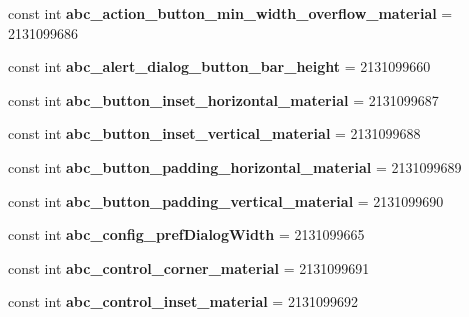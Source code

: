 \begin{DoxyCompactItemize}
const int {\bfseries abc\+\_\+action\+\_\+button\+\_\+min\+\_\+width\+\_\+overflow\+\_\+material} = 2131099686
\item 
\mbox{\label{classXaria_1_1Resource_1_1Dimension_a664c35cef7f345724371f308d2eff018}} 
const int {\bfseries abc\+\_\+alert\+\_\+dialog\+\_\+button\+\_\+bar\+\_\+height} = 2131099660
\item 
\mbox{\label{classXaria_1_1Resource_1_1Dimension_a2368b02c2bd6f322ac9a4c2187ea9846}} 
const int {\bfseries abc\+\_\+button\+\_\+inset\+\_\+horizontal\+\_\+material} = 2131099687
\item 
\mbox{\label{classXaria_1_1Resource_1_1Dimension_a1a6eefb01eb4f61d93b0d4a05e4269e3}} 
const int {\bfseries abc\+\_\+button\+\_\+inset\+\_\+vertical\+\_\+material} = 2131099688
\item 
\mbox{\label{classXaria_1_1Resource_1_1Dimension_a255e270df1e8fcaf77a4a60d386802fe}} 
const int {\bfseries abc\+\_\+button\+\_\+padding\+\_\+horizontal\+\_\+material} = 2131099689
\item 
\mbox{\label{classXaria_1_1Resource_1_1Dimension_afe5da03dcfd73a8e881bcd8be643ead4}} 
const int {\bfseries abc\+\_\+button\+\_\+padding\+\_\+vertical\+\_\+material} = 2131099690
\item 
\mbox{\label{classXaria_1_1Resource_1_1Dimension_ad1eabbc683c3d80fa9370606516b7a1c}} 
const int {\bfseries abc\+\_\+config\+\_\+pref\+Dialog\+Width} = 2131099665
\item 
\mbox{\label{classXaria_1_1Resource_1_1Dimension_a4c115f5595c2f85b912aa87b25f14b75}} 
const int {\bfseries abc\+\_\+control\+\_\+corner\+\_\+material} = 2131099691
\item 
\mbox{\label{classXaria_1_1Resource_1_1Dimension_a6c3b63b1968354e4cdecb7796c678add}} 
const int {\bfseries abc\+\_\+control\+\_\+inset\+\_\+material} = 2131099692
\item 
\mbox{\label{classXaria_1_1Resource_1_1Dimension_ac368031322565d78bffbc12eb58a5e86}} 

\end{DoxyCompactItemize}
